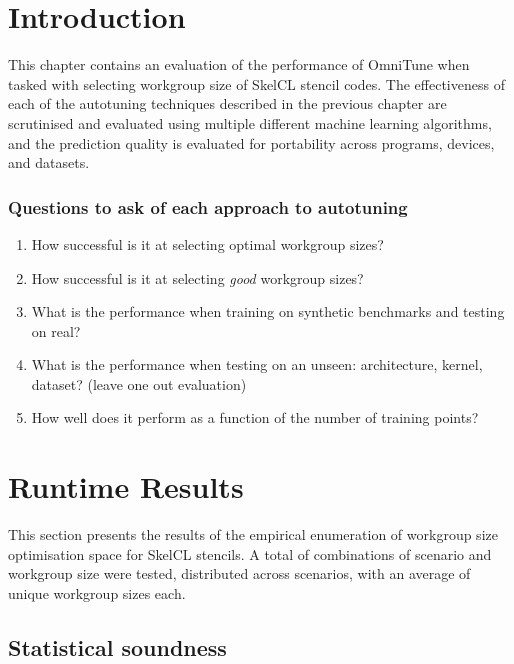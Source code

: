 \section{Introduction}

This chapter contains an evaluation of the performance of OmniTune
when tasked with selecting workgroup size of SkelCL stencil codes. The
effectiveness of each of the autotuning techniques described in the
previous chapter are scrutinised and evaluated using multiple
different machine learning algorithms, and the prediction quality is
evaluated for portability across programs, devices, and datasets.


\subsubsection{Questions to ask of each approach to autotuning}

\begin{enumerate}
\item How successful is it at selecting optimal workgroup sizes?
\item How successful is it at selecting \emph{good} workgroup sizes?
\item What is the performance when training on synthetic benchmarks
  and testing on real?
\item What is the performance when testing on an unseen: architecture,
  kernel, dataset? (leave one out evaluation)
\item How well does it perform as a function of the number of training
  points?
\end{enumerate}


\section{Runtime Results}

This section presents the results of the empirical enumeration of
workgroup size optimisation space for SkelCL stencils. A total of
 combinations of scenario and workgroup
size were tested, distributed across 
scenarios, with an average of  unique
workgroup sizes each. %

\subsection{Statistical soundness}

